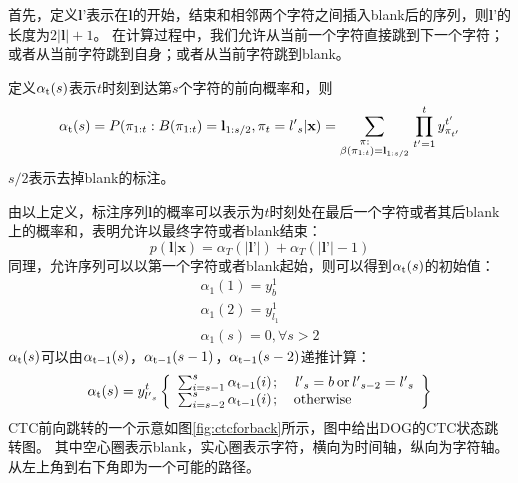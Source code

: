 首先，定义${{\textbf{l'}}}$表示在$\textbf{l}$的开始，结束和相邻两个字符之间插入blank后的序列，则${{\textbf{l'}}}$的长度为$2|{\textbf{l}}| + 1$。
在计算过程中，我们允许从当前一个字符直接跳到下一个字符；或者从当前字符跳到自身；或者从当前字符跳到blank。

定义${\alpha _{\rm{t}}}(s)$表示$t$时刻到达第$s$个字符的前向概率和，则
\begin{equation}
{\alpha _{\rm{t}}}(s) = P({\pi _{1:t}}:B({\pi _{1:t}}) = {{\textbf{l}}_{1:s/2}},{\pi _t} = {{l'}_s}{\rm{|}}{\textbf{x}}{\rm{) = }}\sum\limits_{\scriptstyle{\kern 1pt} {\kern 1pt} {\kern 1pt} {\kern 1pt} {\kern 1pt} {\kern 1pt} {\kern 1pt} {\kern 1pt} {\kern 1pt} {\kern 1pt} {\kern 1pt} {\kern 1pt} {\kern 1pt} {\kern 1pt} \pi :\hfill\atop
\scriptstyle\beta ({\pi _{1:t}}) = {{\textbf{l}}_{1:s/2}}\hfill} {\prod\limits_{t' = 1}^t {y_{{\pi _{t'}}}^{t'}} }
\end{equation}
$s/2$表示去掉blank的标注。

由以上定义，标注序列$\textbf{l}$的概率可以表示为$t$时刻处在最后一个字符或者其后blank上的概率和，表明允许以最终字符或者blank结束：
\begin{equation}
p({\textbf{l}}|{\textbf{x}}) = {\alpha _T}(|{\textbf{l'}}|) + {\alpha _T}(|{\textbf{l'}}| - 1)
\end{equation}
同理，允许序列可以以第一个字符或者blank起始，则可以得到${\alpha _{\rm{t}}}(s)$的初始值：
\begin{equation}
\begin{array}{l}
{\alpha _1}(1) = y_b^1\\
{\alpha _1}(2) = y_{{l_1}}^1\\
{\alpha _1}(s) = 0,\forall s > 2
\end{array}
\end{equation}
${\alpha _{\rm{t}}}(s)$可以由${\alpha _{\rm{t-1}}}(s)$，${\alpha _{\rm{t-1}}}(s-1)$，${\alpha _{\rm{t-1}}}(s-2)$递推计算：
\begin{equation}
\label{equation:alpha}
{\alpha _{\rm{t}}}(s) = y_{{{l'}_s}}^t\left\{ \begin{array}{l}
\sum\nolimits_{i = s - 1}^s {{\alpha _{{\rm{t - 1}}}}(i){\kern 1pt} ;} {\kern 1pt} {\kern 1pt} {\kern 1pt} {\kern 1pt} {\kern 1pt} {\kern 1pt} {\kern 1pt} {\kern 1pt} {\kern 1pt} {\kern 1pt} {\kern 1pt} {\kern 1pt} {\kern 1pt} {{l'}_s} = b{\kern 1pt} {\kern 1pt} {\rm{or}}{\kern 1pt} {\kern 1pt} {{l'}_{s - 2}} = {{l'}_s}\\
\sum\nolimits_{i = s - 2}^s {{\alpha _{{\rm{t - 1}}}}(i){\kern 1pt} ;} {\kern 1pt} {\kern 1pt} {\kern 1pt} {\kern 1pt} {\kern 1pt} {\kern 1pt} {\kern 1pt} {\kern 1pt} {\kern 1pt} {\kern 1pt} {\kern 1pt} {\kern 1pt} {\rm{otherwise}}
\end{array} \right\}
\end{equation}
CTC前向跳转的一个示意如图\ref{fig:ctcforback}所示，图中给出DOG的CTC状态跳转图。
其中空心圈表示blank，实心圈表示字符，横向为时间轴，纵向为字符轴。
从左上角到右下角即为一个可能的路径。


